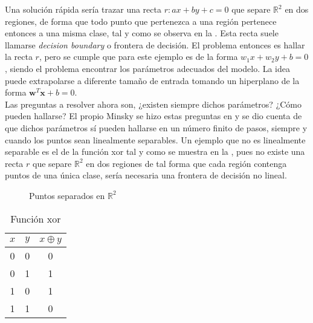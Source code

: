 		Una solución rápida sería trazar una recta $r: ax + by + c = 0$ que separe $\mathbb{R}^2$ en dos regiones, de forma que todo punto que pertenezca a una región pertenece entonces a una misma clase, tal y como se observa en la . Esta recta suele llamarse \textit{decision boundary} o frontera de decisión. El problema entonces es hallar la recta $r$, pero se cumple que para este ejemplo es de la forma $w_1 x + w_2 y + b = 0$, siendo el problema encontrar los parámetros adecuados del modelo. La idea puede extrapolarse a diferente tamaño de entrada tomando un hiperplano de la forma $\textbf{w}^T \textbf{x} + b = 0$. \\
		
		Las preguntas a resolver ahora son, ¿existen siempre dichos parámetros? ¿Cómo pueden hallarse? El propio Minsky se hizo estas preguntas en \cite{perceptrons} y se dio cuenta de que dichos parámetros sí pueden hallarse en un número finito de pasos, siempre y cuando los puntos sean linealmente separables. Un ejemplo que no es linealmente separable es el de la función \gls{xor} tal y como se muestra en la , pues no existe una recta $r$ que separe $\mathbb{R}^2$ en dos regiones de tal forma que cada región contenga puntos de una única clase, sería necesaria una frontera de decisión no lineal. \\
		
		\begin{figure}
			\centering
			\caption{Puntos separados en $\mathbb{R}^2$}
			\label{fig:separated_label_data}
		\end{figure}
		
		\begin{table}[H]
			\centering
			\begin{tabular}{|c|c|c|}\hline
				$x$ & $y$ & $x \oplus y$\\\hline
				0 & 0 & 0\\\hline
				0 & 1 & 1\\\hline
				1 & 0 & 1\\\hline
				1 & 1 & 0\\\hline
			\end{tabular}
			\caption{Función \gls{xor}}
			\label{table:xor}
		\end{table}
		
